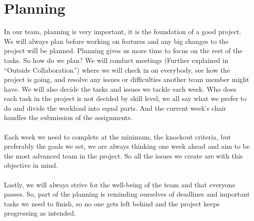 \section{Planning}
In our team, planning is very important, it is the foundation of a good project. We will always plan before working on features and any big changes to the project will be planned. Planning gives us more time to focus on the rest of the tasks. So how do we plan? We will conduct meetings (Further explained in “Outside Collaboration”) where we will check in on everybody, see how the project is going, and resolve any issues or difficulties another team member might have. We will also decide the tasks and issues we tackle each week. Who does each task in the project is not decided by skill level, we all say what we prefer to do and divide the workload into equal parts. And the current week’s chair handles the submission of the assignments. 
\\\\
Each week we need to complete at the minimum, the knockout criteria, but preferably the goals we set, we are always thinking one week ahead and aim to be the most advanced team in the project. So all the issues we create are with this objective in mind.
\\\\
Lastly, we will always strive for the well-being of the team and that everyone passes. So, part of the planning is reminding ourselves of deadlines and important tasks we need to finish, so no one gets left behind and the project keeps progressing as intended.

